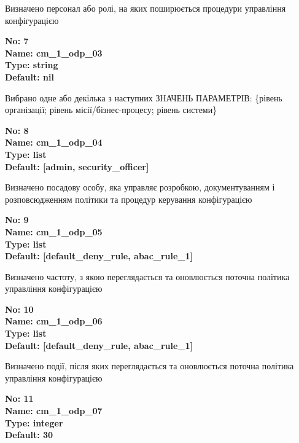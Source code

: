 \documentclass{article}
\begin{document}
{\footnotesize Визначено персонал або ролі, на яких поширюється процедури управління конфігурацією}


{\footnotesize\bfseries
No: 7\\
Name: cm\_\allowbreak{}1\_\allowbreak{}odp\_\allowbreak{}03\\
Type: string\\
Default: nil
}

{\footnotesize Вибрано одне або декілька з наступних ЗНАЧЕНЬ ПАРАМЕТРІВ: \{рівень організації; рівень місії/бізнес-процесу; рівень системи\}}


{\footnotesize\bfseries
No: 8\\
Name: cm\_\allowbreak{}1\_\allowbreak{}odp\_\allowbreak{}04\\
Type: list\\
Default: [\textquotedbl{}admin\textquotedbl{}, \textquotedbl{}security\_\allowbreak{}officer\textquotedbl{}]
}

{\footnotesize Визначено посадову особу, яка управляє розробкою, документуванням і розповсюдженням політики та процедур керування конфігурацією}


{\footnotesize\bfseries
No: 9\\
Name: cm\_\allowbreak{}1\_\allowbreak{}odp\_\allowbreak{}05\\
Type: list\\
Default: [\textquotedbl{}default\_\allowbreak{}deny\_\allowbreak{}rule\textquotedbl{}, \textquotedbl{}abac\_\allowbreak{}rule\_\allowbreak{}1\textquotedbl{}]
}

{\footnotesize Визначено частоту, з якою переглядається та оновлюється поточна політика управління конфігурацією}


{\footnotesize\bfseries
No: 10\\
Name: cm\_\allowbreak{}1\_\allowbreak{}odp\_\allowbreak{}06\\
Type: list\\
Default: [\textquotedbl{}default\_\allowbreak{}deny\_\allowbreak{}rule\textquotedbl{}, \textquotedbl{}abac\_\allowbreak{}rule\_\allowbreak{}1\textquotedbl{}]
}

{\footnotesize Визначено події, після яких переглядається та оновлюється поточна політика управління конфігурацією}


{\footnotesize\bfseries
No: 11\\
Name: cm\_\allowbreak{}1\_\allowbreak{}odp\_\allowbreak{}07\\
Type: integer\\
Default: 30
}
\end{document}
